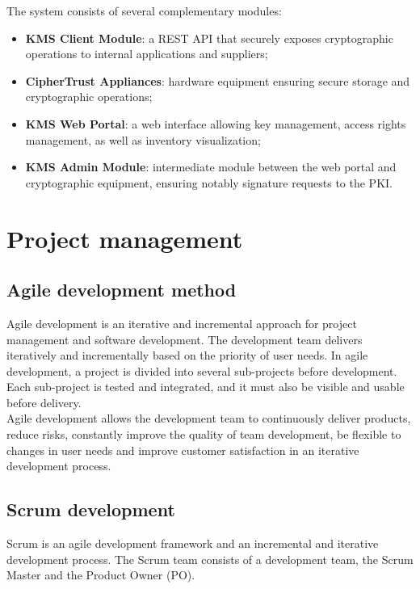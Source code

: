 \noindent
The system consists of several complementary modules:
\begin{itemize}
    \item \textbf{KMS Client Module}: a REST API that securely exposes cryptographic operations to internal applications and suppliers;
    \item \textbf{CipherTrust Appliances}: hardware equipment ensuring secure storage and cryptographic operations;
    \item \textbf{KMS Web Portal}: a web interface allowing key management, access rights management, as well as inventory visualization;
    \item \textbf{KMS Admin Module}: intermediate module between the web portal and cryptographic equipment, ensuring notably signature requests to the PKI.
\end{itemize}

\section{Project management}

\subsection{Agile development method}
Agile development is an iterative and incremental approach for project management and software development. The development team delivers iteratively and incrementally based on the priority of user needs. In agile development, a project is divided into several sub-projects before development. Each sub-project is tested and integrated, and it must also be visible and usable before delivery.\\

Agile development allows the development team to continuously deliver products, reduce risks, constantly improve the quality of team development, be flexible to changes in user needs and improve customer satisfaction in an iterative development process.

\subsection{Scrum development}
Scrum is an agile development framework and an incremental and iterative development process. The Scrum team consists of a development team, the Scrum Master and the Product Owner (PO).
\\


